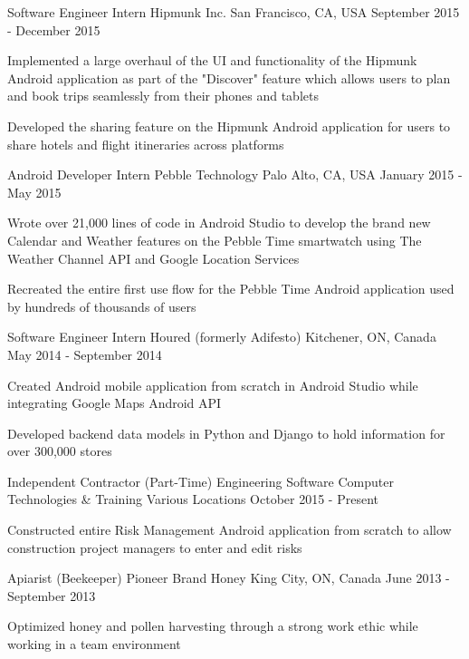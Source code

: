\begin{cventries}
  \cventry
    {Software Engineer Intern}
    {Hipmunk Inc.}
    {San Francisco, CA, USA}
    {September 2015 - December 2015}
    {
      \begin{cvitems}
        \item {Implemented a large overhaul of the UI and functionality of the Hipmunk Android application as part of the "Discover" feature which allows users to plan and book trips seamlessly from their phones and tablets}
        \item {Developed the sharing feature on the Hipmunk Android application for users to share hotels and flight itineraries across platforms}
      \end{cvitems}
    }
  \cventry
    {Android Developer Intern}
    {Pebble Technology}
    {Palo Alto, CA, USA}
    {January 2015 - May 2015}
    {
      \begin{cvitems}
        \item {Wrote over 21,000 lines of code in Android Studio to develop the brand new Calendar and Weather features on the Pebble Time smartwatch using The Weather Channel API and Google Location Services}
        \item {Recreated the entire first use flow for the Pebble Time Android application used by hundreds of thousands of users}
      \end{cvitems}
    }
  \cventry
    {Software Engineer Intern}
    {Houred (formerly Adifesto)}
    {Kitchener, ON, Canada}
    {May 2014 - September 2014}
    {
      \begin{cvitems}
        \item {Created Android mobile application from scratch in Android Studio while integrating Google Maps Android API}
        \item {Developed backend data models in Python and Django to hold information for over 300,000 stores}
      \end{cvitems} 
    }
  \cventry
    {Independent Contractor (Part-Time)}
    {Engineering Software Computer Technologies \& Training}
    {Various Locations}
    {October 2015 - Present}
    {
      \begin{cvitems}
        \item {Constructed entire Risk Management Android application from scratch to allow construction project managers to enter and edit risks}
      \end{cvitems}
    }
  \cventry
    {Apiarist (Beekeeper)}
    {Pioneer Brand Honey}
    {King City, ON, Canada}
    {June 2013 - September 2013}
    {
      \begin{cvitems}
        \item {Optimized honey and pollen harvesting through a strong work ethic while working in a team environment}
      \end{cvitems}
    }
\end{cventries}
